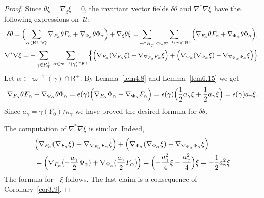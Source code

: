 \documentclass[a4paper,reqno]{amsart}
\theoremstyle{definition}
\theoremstyle{remark}
\theoremstyle{plain}
\numberwithin{equation}{section}
\newcommand{\Qsf}{{\mathsf{Q}}}
\DeclareMathOperator{\rough}{{\nabla^*\nabla}}
\newcommand{\proots}{\mathsf{R}^+}
\newcommand{\Ut}{{\widetilde{\mathcal{U}}}}
\newcommand{\half}{{\frac{1}{2}}}
\begin{document}
 \begin{proof}
   Since $\theta\xi= \nabla_\xi\xi = 0$, the invariant vector fields
 $\delta \theta$ and $\nabla^*\nabla \xi$ have the following expressions
 on~$\Ut$:
\begin{gather*}
    \delta \theta   = \Bigl(\sum_{\alpha \in \proots \cap \Qsf}
    \nabla_{F_\alpha}\theta F_\alpha +
    \nabla_{\Phi_\alpha}\theta \Phi_\alpha \Bigr) + \nabla_\xi
    \theta \xi = \sum_{\gamma \in R_T^+} \, \sum_{\alpha \in
      \varpi^{-1}(\gamma) \cap \proots}
    \Bigl(\nabla_{F_\alpha}\theta F_\alpha +
    \nabla_{\Phi_\alpha}\theta \Phi_\alpha \Bigr), \\
 \nabla^*\nabla  \xi
     =  -\sum_{\gamma \in R_T^+} \, \sum_{\alpha \in
     \varpi^{-1}(\gamma) \cap \proots}
   \Bigl\{  \Bigl(\nabla_{F_\alpha}(\nabla_{F_\alpha}\xi)  - 
  \nabla_{\nabla_{F_\alpha}F_\alpha} \xi \Bigr) %
   + \Bigl(\nabla_{\Phi_\alpha}(\nabla_{\Phi_\alpha}\xi) -
  \nabla_{\nabla_{\Phi_\alpha}\Phi_\alpha} \xi\Bigr) \Bigr\}.
\end{gather*}
Let $\alpha \in \varpi^{-1}(\gamma) \cap \proots$. By
Lemma~\ref{lem4.8} and Lemma~\ref{lem6.15} we get
\[
\nabla_{F_\alpha}\theta F_\alpha +
    \nabla_{\Phi_\alpha}\theta \Phi_\alpha = \epsilon(\gamma)\Bigl(\nabla_{F_\alpha}\Phi_\alpha -
    \nabla_{\Phi_\alpha} F_\alpha\Bigr) = 
    \epsilon(\gamma)\Bigl(\half a_\gamma \xi  +\half a_\gamma \xi\Bigr) =
    \epsilon(\gamma) a_\gamma \xi.
\]
Since $a_\gamma = \gamma(Y_0)/\kappa_\gamma$ we have proved the
desired formula for $\delta \theta$.

The  computation of  $\nabla^*\nabla  \xi$ is similar. Indeed,
 \begin{align*}
 \phantom{,} &\Bigl(\nabla_{F_\alpha}(\nabla_{F_\alpha}\xi)  -
  \nabla_{\nabla_{F_\alpha}F_\alpha} \xi \Bigr) +
               \Bigl(\nabla_{\Phi_\alpha}(\nabla_{\Phi_\alpha}\xi)
               - \nabla_{\nabla_{\Phi_\alpha}\Phi_\alpha} \xi
               \Bigr) 
   \\
    & =
 \Bigl(\nabla_{F_\alpha} (-\frac{a_\gamma}{2}
  \Phi_\alpha) + \nabla_{\Phi_\alpha} (\frac{a_\gamma}{2}
  F_\alpha)\Bigr)  = 
  \Bigl(-\frac{a^2_\gamma}{4} \xi - \frac{a^2_\gamma}{4}\Bigr)
     \xi
= -\half   a_\gamma^2 \xi. 
\end{align*}
The formula for $\rough \xi$ follows. The last claim is a consequence of Corollary~\ref{cor3.9}.
 \end{proof}
\end{document}
